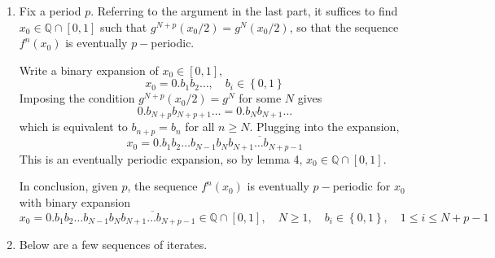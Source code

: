\documentclass{article}
\def\mbb#1{\mathbb{#1}}
\def\bQ{\mbb{Q}}
\newcommand{\brc}[1]{\left\{#1\right\}}
\renewcommand{\bar}{\overline}
\begin{document}
\begin{enumerate}
\begin{enumerate}
		
		
		\item Fix a period $p$. Referring to the argument in the last part, it suffices to find $x_0\in\bQ\cap[0,1]$ such that $g^{N+p}(x_0/2)=g^N(x_0/2)$, so that the sequence $f^n(x_0)$ is eventually $p-$periodic.
		
		Write a binary expansion of $x_0\in[0,1]$,
		\[x_0 = 0.b_1b_2\dots,
		\quad b_i\in\brc{0,1}\]
		Imposing the condition $g^{N+p}(x_0/2)=g^N$ for some $N$ gives
		\[0.b_{N+p}b_{N+p+1}\dots = 0.b_Nb_{N+1}\dots\]
		which is equivalent to $b_{n+p}=b_n$ for all $n\ge N$. Plugging into the expansion,
		\[x_0 = 0.b_1b_2\dots b_{N-1}\bar{b_Nb_{N+1}\dots b_{N+p-1}}\]
		This is an eventually periodic expansion, so by lemma 4, $x_0\in\bQ\cap[0,1]$.
		
		In conclusion, given $p$, the sequence $f^n(x_0)$ is eventually $p-$periodic for $x_0$ with binary expansion
		\[x_0 = 0.b_1b_2\dots b_{N-1}\bar{b_Nb_{N+1}\dots b_{N+p-1}}\in\bQ\cap[0,1],
		\quad N\ge1,
		\quad b_i\in\brc{0,1},
		\quad 1\le i\le N+p-1\]
		
		
		
		
		\item Below are a few sequences of iterates.
		

\end{enumerate}
\end{enumerate}
\end{document}
